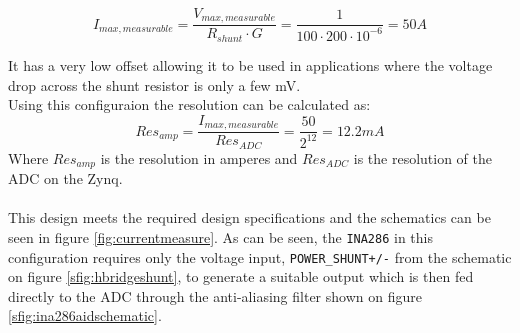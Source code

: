 \begin{equation}
	I_{max, measurable} = \frac{V_{max, measurable}}{R_{shunt}\cdot G} = \frac{1}{100 \cdot 200\cdot10^{-6} } = 50A
	\label{eq:adc_input_voltage3}
\end{equation}

It has a very low offset allowing it to be used in applications where the voltage drop across the shunt resistor is only a few mV.
\\
Using this configuraion the resolution can be calculated as:
\begin{equation}
	Res_{amp} = \frac{I_{max,measurable}}{Res_{ADC}} = \frac{50}{2^{12}}  = 12.2 mA
\end{equation}
Where $Res_{amp}$ is the resolution in amperes and $Res_{ADC}$ is the resolution of the ADC on the Zynq.
\\~\\
This design meets the required design specifications and the schematics can be seen in figure \ref{fig:currentmeasure}.
As can be seen, the \texttt{INA286} in this configuration requires only the voltage input, \texttt{POWER\_SHUNT+/-} from the schematic on figure \ref{sfig:hbridgeshunt}, to generate a suitable output which is then fed directly to the ADC through the anti-aliasing filter shown on figure \ref{sfig:ina286aidschematic}.

